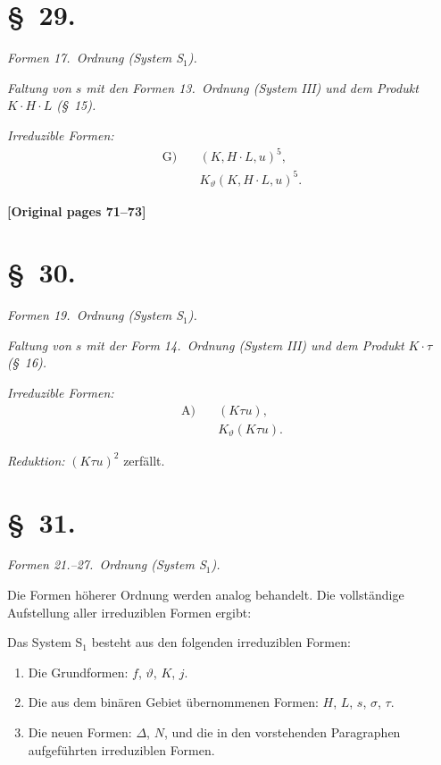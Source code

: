 \documentclass[12pt,a4paper]{article}
\begin{document}
\section*{\S\ 29.}

\textit{Formen 17.\ Ordnung (System S$_1$).}

\textit{Faltung von $s$ mit den Formen 13.\ Ordnung (System III) und dem Produkt $K \cdot H \cdot L$ (\S\ 15).}

\textit{Irreduzible Formen:}
\begin{align*}
\text{G)} \quad &(K, H \cdot L, u)^5,\\
& K_\vartheta(K, H \cdot L, u)^5.
\end{align*}

\noindent\textbf{[Original pages 71--73]}

\section*{\S\ 30.}

\textit{Formen 19.\ Ordnung (System S$_1$).}

\textit{Faltung von $s$ mit der Form 14.\ Ordnung (System III) und dem Produkt $K \cdot \tau$ (\S\ 16).}

\textit{Irreduzible Formen:}
\begin{align*}
\text{A)} \quad &(K\tau u),\\
& K_\vartheta(K\tau u).
\end{align*}

\textit{Reduktion:} $(K\tau u)^2$ zerfällt.

\section*{\S\ 31.}

\textit{Formen 21.--27.\ Ordnung (System S$_1$).}

Die Formen höherer Ordnung werden analog behandelt. Die vollständige Aufstellung aller irreduziblen Formen ergibt:

Das System S$_1$ besteht aus den folgenden irreduziblen Formen:
\begin{enumerate}
\item[1.] Die Grundformen: $f$, $\vartheta$, $K$, $j$.
\item[2.] Die aus dem binären Gebiet übernommenen Formen: $H$, $L$, $s$, $\sigma$, $\tau$.
\item[3.] Die neuen Formen: $\varDelta$, $N$, und die in den vorstehenden Paragraphen aufgeführten irreduziblen Formen.
\end{enumerate}
\end{document}
